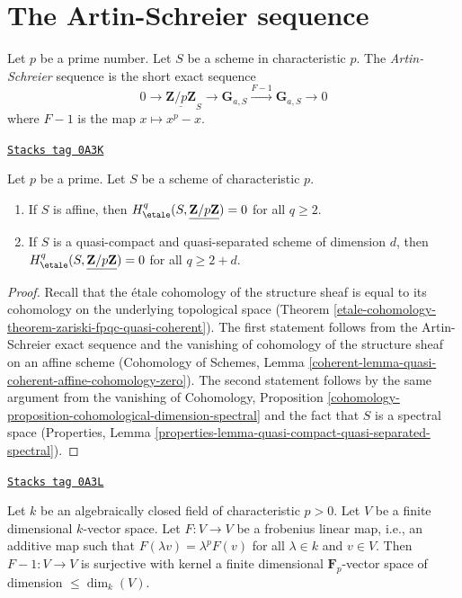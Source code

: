 \section{The Artin-Schreier sequence}
\label{etale-cohomology-section-artin-schreier}
Let $p$ be a prime number. Let $S$ be a scheme in characteristic $p$.
The {\it Artin-Schreier} sequence is the short exact sequence
$$
0 \longrightarrow \underline{\mathbf{Z}/p\mathbf{Z}}_S \longrightarrow
\mathbf{G}_{a, S} \xrightarrow{F-1} \mathbf{G}_{a, S} \longrightarrow 0
$$
where $F - 1$ is the map $x \mapsto x^p - x$.

\begin{lemma}
\label{etale-cohomology-lemma-vanishing-affine-char-p-p}
\href{https://stacks.math.columbia.edu/tag/0A3K}{\texttt{Stacks tag 0A3K}}

Let $p$ be a prime. Let $S$ be a scheme of characteristic $p$.
\begin{enumerate}
\item If $S$ is affine, then
$H_\etale^q(S, \underline{\mathbf{Z}/p\mathbf{Z}}) = 0$ for all
$q \geq 2$.
\item If $S$ is a quasi-compact and quasi-separated scheme of
dimension $d$, then $H_\etale^q(S, \underline{\mathbf{Z}/p\mathbf{Z}}) = 0$
for all $q \geq 2 + d$.
\end{enumerate}
\end{lemma}

\begin{proof}
Recall that the \'etale cohomology of the structure sheaf is equal
to its cohomology on the underlying topological space
(Theorem \ref{etale-cohomology-theorem-zariski-fpqc-quasi-coherent}).
The first statement follows from the Artin-Schreier exact sequence
and the vanishing of cohomology of the structure sheaf on an affine
scheme (Cohomology of Schemes, Lemma
\ref{coherent-lemma-quasi-coherent-affine-cohomology-zero}).
The second statement follows by the same argument from
the vanishing of Cohomology, Proposition
\ref{cohomology-proposition-cohomological-dimension-spectral}
and the fact that $S$ is a spectral space
(Properties, Lemma
\ref{properties-lemma-quasi-compact-quasi-separated-spectral}).
\end{proof}

\begin{lemma}[F 1]
\label{etale-cohomology-lemma-F-1}
\href{https://stacks.math.columbia.edu/tag/0A3L}{\texttt{Stacks tag 0A3L}}

Let $k$ be an algebraically closed field of characteristic $p > 0$.
Let $V$ be a finite dimensional $k$-vector space. Let $F : V \to V$
be a frobenius linear map, i.e., an additive map such that
$F(\lambda v) = \lambda^p F(v)$ for all $\lambda \in k$ and $v \in V$.
Then $F - 1 : V \to V$ is surjective with kernel a finite dimensional
$\mathbf{F}_p$-vector space of dimension $\leq \dim_k(V)$.
\end{lemma}

